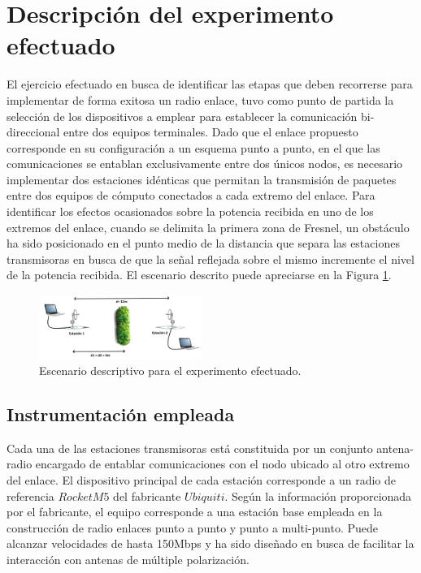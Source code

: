 \documentclass[conference]{IEEEtran}
\begin{document}
\section{Descripción del experimento efectuado}
El ejercicio efectuado en busca de identificar las etapas que deben recorrerse para implementar de forma exitosa un radio enlace, tuvo como 
punto de partida la selección de los dispositivos a emplear para establecer la comunicación bi-direccional entre dos equipos terminales. Dado que el 
enlace propuesto corresponde en su configuración a un esquema punto a punto, en el que las comunicaciones se entablan exclusivamente entre dos
únicos nodos, es necesario implementar dos estaciones idénticas que permitan la transmisión de paquetes entre dos equipos de cómputo conectados
a cada extremo del enlace. Para identificar los efectos ocasionados sobre la potencia recibida en uno de los extremos del enlace, cuando se delimita
la primera zona de Fresnel, un obstáculo ha sido posicionado en el punto medio de la distancia que separa las estaciones transmisoras en busca de que
la señal reflejada sobre el mismo incremente el nivel de la potencia recibida. El escenario descrito puede apreciarse en la Figura \ref{fig:Escenario}.
\begin{figure}
    \centering
          \includegraphics[width=0.47\textwidth]{Escenario.png}
        \caption{Escenario descriptivo para el experimento efectuado.
        }
        \label{fig:Escenario}
\end{figure}
\subsection{Instrumentación empleada}
Cada una de las estaciones transmisoras está constituida por un conjunto antena-radio encargado de entablar comunicaciones con el nodo ubicado al 
otro extremo del enlace. El dispositivo principal de cada estación corresponde a un radio de referencia $Rocket M5$ del fabricante $Ubiquiti$. Según la 
información proporcionada por el fabricante, el equipo corresponde a una estación base empleada en la construcción de radio enlaces punto a punto y
punto a multi-punto. Puede alcanzar velocidades de hasta 150Mbps y ha sido diseñado en busca de facilitar la interacción con antenas de múltiple polarización.
\end{document}
